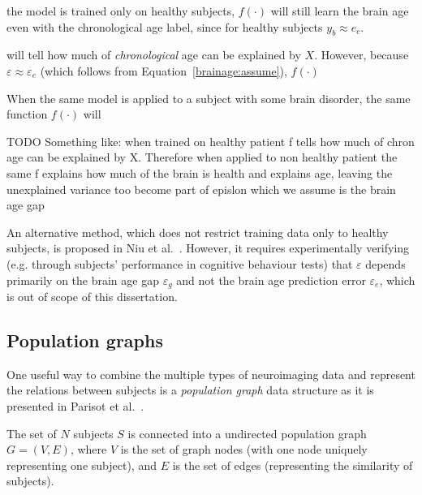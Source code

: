 the model is trained only on healthy subjects, $f(\cdot)$ will still learn the brain age even with the chronological age label, since for healthy subjects $y_b \approx e_c$. 


will tell how much of \textit{chronological} age can be explained by $X$. However, because $\varepsilon \approx \varepsilon_e$ (which follows from Equation~\eqref{brainage:assume}), $f(\cdot)$ 


When the same model is applied to a subject with some brain disorder, the same function $f(\cdot)$ will  

% 


TODO Something like: when trained on healthy patient f tells how much of chron age can be explained by X. Therefore when applied to non healthy patient the same f explains how much of the brain is health and explains age, leaving the unexplained variance too become part of epislon which we assume is the brain age gap

An alternative method, which does not restrict training data only to healthy subjects, is proposed in Niu et al.~\cite{niu2019improved}. However, it requires experimentally verifying (e.g. through subjects' performance in cognitive behaviour tests) that $\varepsilon$ depends primarily on the brain age gap $\varepsilon_g$ and not the brain age prediction error $\varepsilon_e$, which is out of scope of this dissertation.



\subsection{Population graphs}
\label{population-graphs}

One useful way to combine the multiple types of neuroimaging data and represent the relations between subjects is a \textit{population graph} data structure as it is presented in Parisot et al.~\cite{parisot2018disease}.

The set of $N$ subjects $S$ is connected into a undirected population graph $G = (V, E)$, where $V$ is the set of graph nodes (with one node uniquely representing one subject), and $E$ is the set of edges (representing the similarity of subjects).

